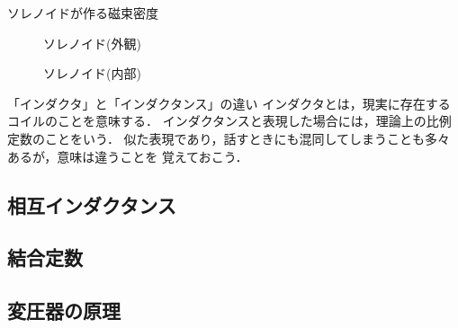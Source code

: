 \begin{memo}{ソレノイドが作る磁束密度}
\begin{figure}[hbt]
\begin{center}
                                \label{fig:sorenoido11}
                                \caption{ソレノイド(外観)}
                        \end{center}
                \end{figure}
                \begin{figure}[hbt]
                        \begin{center}
                                \caption{ソレノイド(内部)}
                                \label{fig:sorenoido22}
                        \end{center}
                \end{figure}
        \end{memo}

    \begin{memo}{「インダクタ」と「インダクタンス」の違い}
        インダクタとは，現実に存在するコイルのことを意味する．
        インダクタンスと表現した場合には，理論上の比例定数のことをいう．
        似た表現であり，話すときにも混同してしまうことも多々あるが，意味は違うことを
        覚えておこう．
    \end{memo}

    \subsection{相互インダクタンス}


    \subsection{結合定数}

    \subsection{変圧器の原理}
